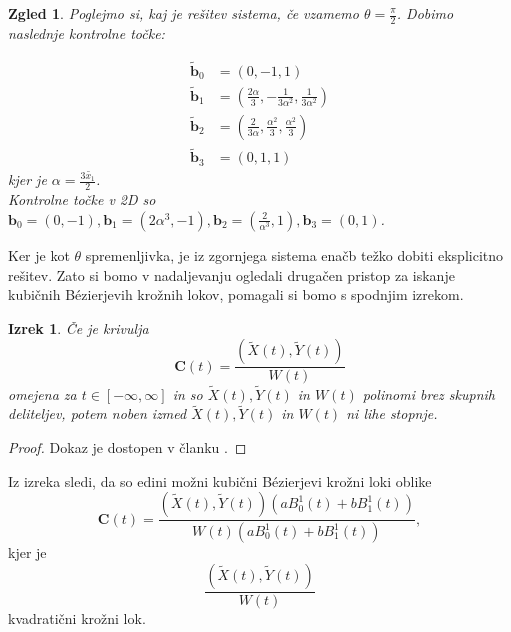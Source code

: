 \documentclass[a4paper,11pt]{article}
\theoremstyle{definition}
\theoremstyle{plain}
\newtheorem*{izrek}{Izrek}
\newtheorem*{zgled}{Zgled}
\begin{document}
\begin{zgled}
Poglejmo si, kaj je rešitev sistema, če vzamemo $\theta= \frac{\pi}{2}$. Dobimo naslednje kontrolne točke:

\begin{align*}
\boldsymbol{\tilde{b}}_0 &= (0,-1,1) \\
\boldsymbol{\tilde{b}}_1 &= (\frac{2\alpha}{3},-\frac{1}{3\alpha^2},\frac{1}{3\alpha^2}) \\
\boldsymbol{\tilde{b}}_2 &= (\frac{2}{3\alpha},\frac{\alpha^2}{3},\frac{\alpha^2}{3}) \\
\boldsymbol{\tilde{b}}_3 &= (0,1,1)
\end{align*}
kjer je $\alpha=\frac{3\tilde{x_1}}{2}$. \\
Kontrolne točke v 2D so $\boldsymbol{b}_0 = (0,-1),\boldsymbol{b}_1 = (2\alpha^3,-1),\boldsymbol{b}_2 = (\frac{2}{\alpha^3},1),\boldsymbol{b}_3 = (0,1)$.
\end{zgled}

Ker je kot $\theta$ spremenljivka, je iz zgornjega sistema enačb težko dobiti eksplicitno rešitev. Zato si bomo v nadaljevanju ogledali drugačen pristop za iskanje kubičnih B\'ezierjevih krožnih lokov, pomagali si bomo s spodnjim izrekom.

\begin{izrek}
Če je krivulja
$$\boldsymbol{C}(t)=\frac{(\tilde{X}(t),\tilde{Y}(t))}{W(t)}$$
omejena za $t\in [-\infty,\infty]$ in so $\tilde{X}(t),\tilde{Y}(t)$ in $W(t)$ polinomi brez skupnih deliteljev, potem noben izmed $\tilde{X}(t),\tilde{Y}(t)$ in $W(t)$ ni lihe stopnje.
\end{izrek}

\begin{proof}
Dokaz je dostopen v članku \cite{chou}.
\end{proof}

Iz izreka sledi, da so edini možni kubični B\'ezierjevi krožni loki oblike
$$\boldsymbol{C}(t)=\frac{(\tilde{X}(t),\tilde{Y}(t))(aB_0^1(t)+bB_1^1(t))}{W(t)(aB_0^1(t)+bB_1^1(t))},$$
kjer je $$\frac{(\tilde{X}(t),\tilde{Y}(t))}{W(t)}$$
kvadratični krožni lok.\\
\end{document}
